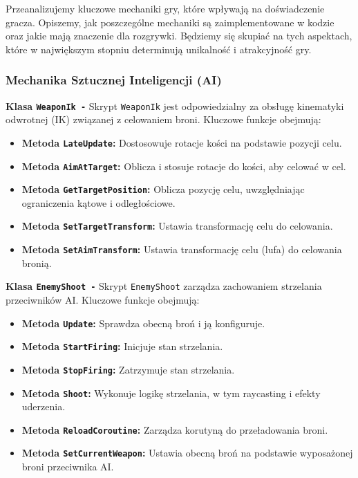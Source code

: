 Przeanalizujemy kluczowe mechaniki gry, które wpływają na doświadczenie gracza. Opiszemy, jak poszczególne mechaniki są zaimplementowane w kodzie oraz jakie mają znaczenie dla rozgrywki. Będziemy się skupiać na tych aspektach, które w największym stopniu determinują unikalność i atrakcyjność gry.

\subsubsection{Mechanika Sztucznej Inteligencji (AI)}

\textbf{Klasa \texttt{WeaponIk -}}
Skrypt \texttt{WeaponIk} jest odpowiedzialny za obsługę kinematyki odwrotnej (IK) związanej z celowaniem broni. Kluczowe funkcje obejmują:
\begin{itemize}
\item \textbf{Metoda \texttt{LateUpdate}:} Dostosowuje rotacje kości na podstawie pozycji celu.
\item \textbf{Metoda \texttt{AimAtTarget}:} Oblicza i stosuje rotacje do kości, aby celować w cel.
\item \textbf{Metoda \texttt{GetTargetPosition}:} Oblicza pozycję celu, uwzględniając ograniczenia kątowe i odległościowe.
\item \textbf{Metoda \texttt{SetTargetTransform}:} Ustawia transformację celu do celowania.
\item \textbf{Metoda \texttt{SetAimTransform}:} Ustawia transformację celu (lufa) do celowania bronią.
\end{itemize}

\textbf{Klasa \texttt{EnemyShoot -}}
Skrypt \texttt{EnemyShoot} zarządza zachowaniem strzelania przeciwników AI. Kluczowe funkcje obejmują:
\begin{itemize}
\item \textbf{Metoda \texttt{Update}:} Sprawdza obecną broń i ją konfiguruje.
\item \textbf{Metoda \texttt{StartFiring}:} Inicjuje stan strzelania.
\item \textbf{Metoda \texttt{StopFiring}:} Zatrzymuje stan strzelania.
\item \textbf{Metoda \texttt{Shoot}:} Wykonuje logikę strzelania, w tym raycasting i efekty uderzenia.
\item \textbf{Metoda \texttt{ReloadCoroutine}:} Zarządza korutyną do przeładowania broni.
\item \textbf{Metoda \texttt{SetCurrentWeapon}:} Ustawia obecną broń na podstawie wyposażonej broni przeciwnika AI.
\end{itemize}

